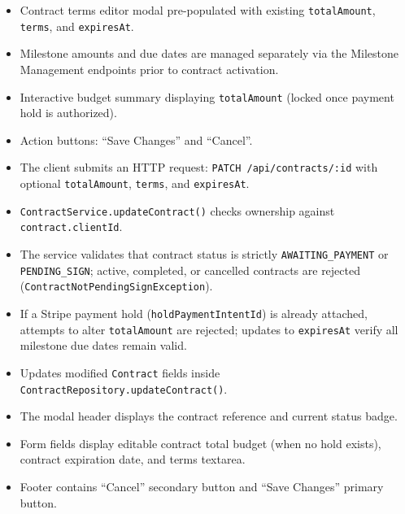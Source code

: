 \begin{itemize}[leftmargin=1.6em,topsep=3pt,itemsep=2pt,parsep=0pt,label=$\bullet$]
      \item Contract terms editor modal pre-populated with existing \texttt{totalAmount}, \texttt{terms}, and \texttt{expiresAt}.
      \item Milestone amounts and due dates are managed separately via the Milestone Management endpoints prior to contract activation.
      \item Interactive budget summary displaying \texttt{totalAmount} (locked once payment hold is authorized).
      \item Action buttons: ``Save Changes'' and ``Cancel''.
\end{itemize}

\begin{itemize}[leftmargin=1.6em,topsep=3pt,itemsep=2pt,parsep=0pt,label=$\bullet$]
      \item The client submits an HTTP request: \texttt{PATCH /\allowbreak{}api/\allowbreak{}contracts/\allowbreak{}:\allowbreak{}id} with optional \texttt{totalAmount}, \texttt{terms}, and \texttt{expiresAt}.
      \item {\sloppy \texttt{Contract\allowbreak{}Service.\allowbreak{}update\allowbreak{}Contract()} checks ownership against \texttt{contract.clientId}.\par}
      \item {\sloppy The service validates that contract status is strictly \texttt{AWAITING\_\allowbreak{}PAYMENT} or \texttt{PENDING\_\allowbreak{}SIGN}; active, completed, or cancelled contracts are rejected (\texttt{Contract\allowbreak{}Not\allowbreak{}Pending\allowbreak{}Sign\allowbreak{}Exception}).\par}
      \item {\sloppy If a Stripe payment hold (\texttt{hold\allowbreak{}Payment\allowbreak{}Intent\allowbreak{}Id}) is already attached, attempts to alter \texttt{total\allowbreak{}Amount} are rejected; updates to \texttt{expires\allowbreak{}At} verify all milestone due dates remain valid.\par}
      \item {\sloppy Updates modified \texttt{Contract} fields inside \texttt{Contract\allowbreak{}Repository.\allowbreak{}update\allowbreak{}Contract()}.\par}
\end{itemize}

\begin{itemize}[leftmargin=1.6em,topsep=3pt,itemsep=2pt,parsep=0pt,label=$\bullet$]
      \item The modal header displays the contract reference and current status badge.
      \item Form fields display editable contract total budget (when no hold exists), contract expiration date, and terms textarea.
      \item Footer contains ``Cancel'' secondary button and ``Save Changes'' primary button.
\end{itemize}

